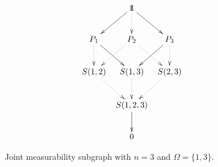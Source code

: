 \begin{figure}[h]
$$
\xymatrix@C=2mm{
&&&\bbone \ar[dl]\ar[dr]\ar@{..>}[d]&&&\\
&&P_{1}\ar@{->}[dr]\ar@{..>}[d]&P_{2}\ar@{..>}[dl]\ar@{..>}[dr]&P_{3}\ar@{..>}[d]\ar@{->}[dl]&&\\
&&S(1,2)\ar@{..>}[dr]&S(1,3)\ar@{..>}[d]&S(2,3)\ar@{..>}[dl]&&\\
&&&\ar[d]S(1,2,3)&&&\\
&&&0&&&
}
$$
\caption{Joint measurability subgraph with $n=3$ and $\Omega = \{1,3\}$.}
\label{fig:subgraphn3omega2}
\end{figure}